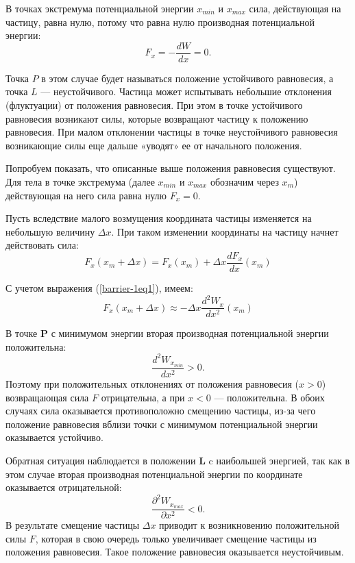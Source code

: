 \documentclass[14pt,a4paper,oneside]{extarticle}	%
\begin{document}
В точках экстремума потенциальной энергии $ x_{min} $ и $ x_{max} $ сила, действующая на частицу, равна нулю, потому что равна нулю производная потенциальной энергии:
\begin{equation}\label{barrier-1eq1}
F_{x} = -\frac{d W}{d x} = 0.
\end{equation}

Точка $ P $ в этом случае будет называться положение устойчивого равновесия, а точка $ L $ — неустойчивого. 
Частица может испытывать небольшие отклонения (флуктуации) от положения равновесия.
При этом в точке устойчивого равновесия возникают силы, которые возвращают частицу к положению равновесия. 
При малом отклонении частицы в точке неустойчивого равновесия возникающие силы еще дальше «уводят» ее от начального положения.

Попробуем показать, что описанные выше положения равновесия существуют.
Для тела в точке экстремума (далее $ x_{min} $ и $ x_{max} $ обозначим через $ x_{m} $) действующая на него сила равна нулю $ F_{x} = 0 $.

Пусть вследствие малого возмущения координата частицы изменяется на небольшую величину $ \Delta x $. 
При таком изменении координаты на частицу начнет действовать сила:
\begin{equation}\label{barrier-1eq2}
F_{x}(x_{m} + \Delta x) = F_{x}(x_{m}) + \Delta x \frac{d F_{x}}{d x}(x_{m})
\end{equation}

С учетом выражения (\ref{barrier-1eq1}), имеем:
\begin{equation}\label{barrier-1eq3}
F_{x}(x_{m} + \Delta x) \approx - \Delta x \frac{d^{2} W_{x}}{d x^{2}}(x_{m})
\end{equation}

В точке \textbf{P} с минимумом энергии вторая производная потенциальной энергии положительна: $$ \frac{d^{2} W_{x_{min}}}{d x^{2}} > 0.$$
Поэтому при положительных отклонениях от положения равновесия ($ x > 0 $) возвращающая сила $ F $ отрицательна, а при $ x<0 $ — положительна.
В обоих случаях сила оказывается противоположно смещению частицы, из-за чего положение равновесия вблизи точки с минимумом потенциальной энергии оказывается устойчиво.

Обратная ситуация наблюдается в положении \textbf{L} c наибольшей энергией, так как в этом случае вторая производная потенциальной энергии по координате оказывается отрицательной: $$ \frac{\partial^{2} W_{x_{max}}}{\partial x^{2}} < 0. $$ 
В результате смещение частицы  $ \Delta x $ приводит к возникновению положительной силы $ F $, которая в свою очередь только увеличивает смещение частицы из положения равновесия. 
Такое положение равновесия оказывается неустойчивым.
\end{document}
